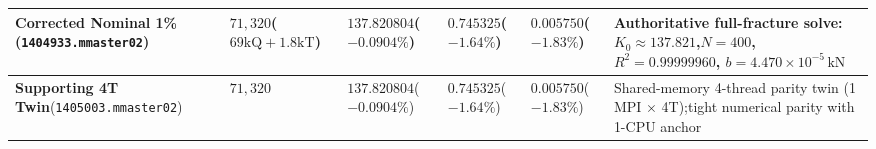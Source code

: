 \documentclass[10pt,a4paper]{article}
\begin{document}
\begin{table}[h!]
\begin{tabularx}{\textwidth}{L{36mm} C{16mm} C{21mm} C{19mm} C{17mm} X}
    \midrule
    \textbf{Corrected Nominal 1\%}\newline(\texttt{1404933.mmaster02}) & $71{,}320$\newline($69\mathrm{kQ}+1.8\mathrm{kT}$) & $\mathbf{137.820804}$\newline($-0.0904\%$) & $\mathbf{0.745325}$\newline($-1.64\%$) & $\mathbf{0.005750}$\newline($-1.83\%$) & Authoritative full-fracture solve: $K_0 \approx 137.821$,\newline$N=400$, $R^2=0.99999960$, $b=4.470 \times 10^{-5}\,\mathrm{kN}$ \\
    \midrule
    \textbf{Supporting 4T Twin}\newline(\texttt{1405003.mmaster02}) & $71{,}320$ & $137.820804$\newline($-0.0904\%$) & $0.745325$\newline($-1.64\%$) & $0.005750$\newline($-1.83\%$) & Shared-memory 4-thread parity twin (1 MPI $\times$ 4T);\newline tight numerical parity with 1-CPU anchor \\
    \bottomrule
  \end{tabularx}
\end{table}
\end{document}
